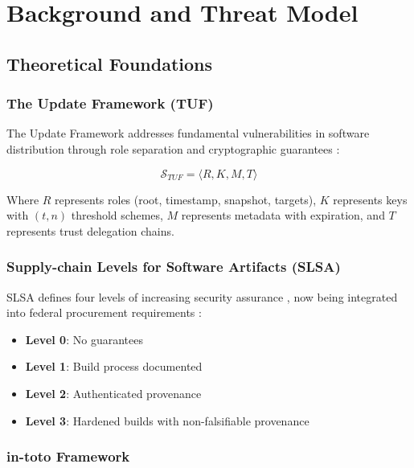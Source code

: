 \documentclass[11pt,a4paper]{article}
\begin{document}
\section{Background and Threat Model}

\subsection{Theoretical Foundations}

\subsubsection{The Update Framework (TUF)}

The Update Framework addresses fundamental vulnerabilities in software distribution through role separation and cryptographic guarantees \cite{kuppusamy2016tuf}:

\begin{equation}
\mathcal{S}_{TUF} = \langle R, K, M, T \rangle
\end{equation}

Where $R$ represents roles (root, timestamp, snapshot, targets), $K$ represents keys with $(t,n)$ threshold schemes, $M$ represents metadata with expiration, and $T$ represents trust delegation chains.

\subsubsection{Supply-chain Levels for Software Artifacts (SLSA)}

SLSA defines four levels of increasing security assurance \cite{google2021slsa}, now being integrated into federal procurement requirements \cite{cisa2024sbom}:

\begin{itemize}
    \item \textbf{Level 0}: No guarantees
    \item \textbf{Level 1}: Build process documented
    \item \textbf{Level 2}: Authenticated provenance
    \item \textbf{Level 3}: Hardened builds with non-falsifiable provenance
\end{itemize}

\subsubsection{in-toto Framework}
\end{document}
